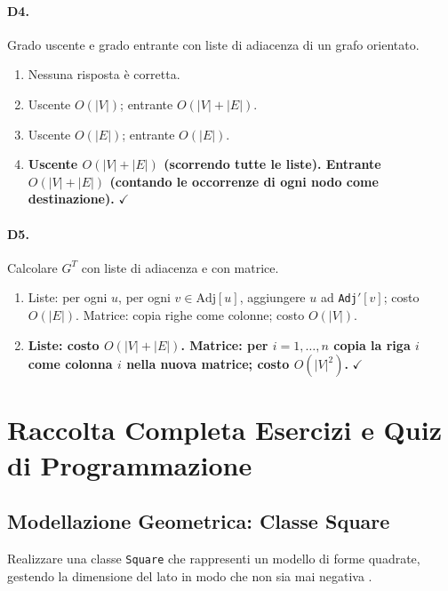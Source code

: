 \paragraph{D4.} Grado uscente e grado entrante con liste di adiacenza di un grafo orientato.
\begin{enumerate}[label=\Alph*.,leftmargin=*]
	\item Nessuna risposta \`e corretta.
	\item Uscente $O(|V|)$; entrante $O(|V|+|E|)$.
	\item Uscente $O(|E|)$; entrante $O(|E|)$.
	\item \textcolor{correctgreen}{\textbf{Uscente $O(|V|+|E|)$ (scorrendo tutte le liste). Entrante $O(|V|+|E|)$ (contando le occorrenze di ogni nodo come destinazione).}} \hfill\textcolor{correctgreen}{$\checkmark$}
\end{enumerate}

\paragraph{D5.} Calcolare $G^T$ con liste di adiacenza e con matrice.
\begin{enumerate}[label=\Alph*.,leftmargin=*]
	\item Liste: per ogni $u$, per ogni $v\in\text{Adj}[u]$, aggiungere $u$ ad \texttt{Adj}$'[v]$; costo $O(|E|)$. Matrice: copia righe come colonne; costo $O(|V|)$.
	\item \textcolor{correctgreen}{\textbf{Liste: costo $O(|V|+|E|)$. Matrice: per $i=1,\ldots,n$ copia la riga $i$ come colonna $i$ nella nuova matrice; costo $O(|V|^2)$.}} \hfill\textcolor{correctgreen}{$\checkmark$}
\end{enumerate}

\section{Raccolta Completa Esercizi e Quiz di Programmazione}

\subsection{Modellazione Geometrica: Classe Square}
\begin{definizione}
	Realizzare una classe \texttt{Square} che rappresenti un modello di forme quadrate, gestendo la dimensione del lato in modo che non sia mai negativa \cite{213, 166}.
\end{definizione}

